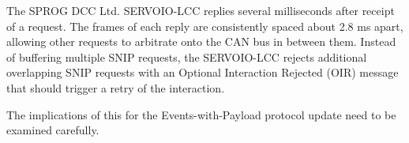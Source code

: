 \documentclass[11pt]{article}
\begin{document}
The SPROG DCC Ltd. SERVOIO-LCC replies several milliseconds after receipt of a 
request.  The frames of each reply are consistently spaced about 2.8 ms
apart, allowing other requests to arbitrate onto the CAN bus in between them.
Instead of buffering multiple SNIP requests, the SERVOIO-LCC rejects additional
overlapping SNIP requests with an 
Optional Interaction Rejected (OIR) message that 
should trigger a retry of the interaction.


The implications of this for the Events-with-Payload protocol update need to be 
examined carefully.
\end{document}
